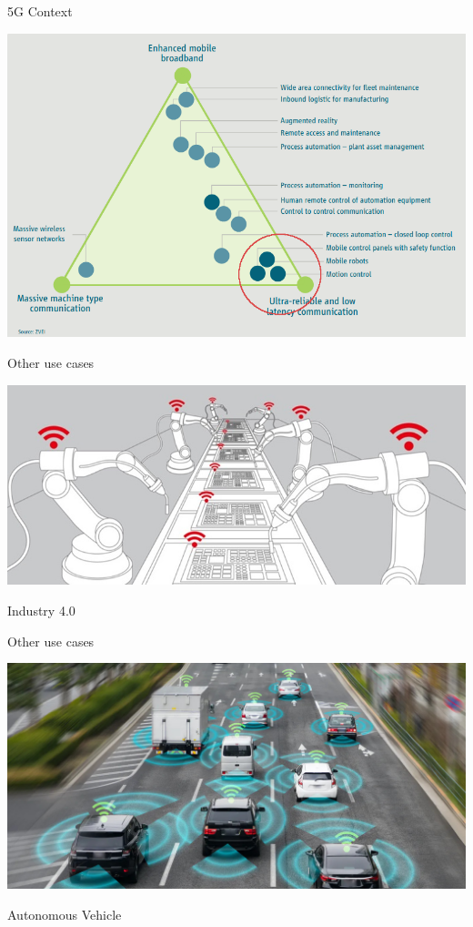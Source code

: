 \documentclass[10 pt]{beamer}
\begin{document}
\begin{frame}{5G Context}


  \centering
  
  \includegraphics[scale=0.4]{usecases.png}
  

\end{frame}
\begin{frame}{Other use cases}


  \centering
  
  \includegraphics[scale=0.4]{ind40.jpg}

  Industry 4.0

\end{frame}
\begin{frame}{Other use cases}


  \centering
  
  \includegraphics[scale=0.25]{vehicle.jpg}

  Autonomous Vehicle

\end{frame}
\end{document}
